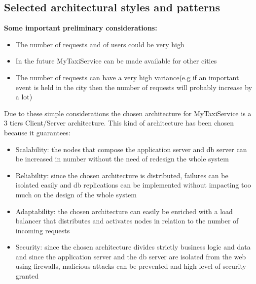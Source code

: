 \documentclass[11pt,titlepage]{article} %
\begin{document}
\subsection{Selected architectural styles and patterns}
        \textbf{Some important preliminary considerations:}
        \begin{itemize}
	        \item The number of requests and of users could be very high
	        \item In the future MyTaxiService can be made available for other cities
	        \item The number of requests can have a very high variance(e.g if an important event is held in the city then the number
	        of requests will probably increase by a lot)
         \end{itemize}

        \noindent Due to these simple considerations the chosen architecture for MyTaxiService is a 3 tiers Client/Server architecture.
        This kind of architecture has been chosen because it guarantees:
        \begin{itemize}
	        \item Scalability: the nodes that compose the application server and db server can be increased in number without the need
	        of redesign the whole system
	        \item Reliability: since the chosen architecture is distributed, failures can be isolated easily and db replications can be
	        implemented without impacting too much on the design of the whole system
	        \item Adaptability: the chosen architecture can easily be enriched with a load balancer that distributes and activates nodes
	        in relation to the number of incoming requests
	        \item Security: since the chosen architecture divides strictly business logic and data and since the application server
	        and the db server are isolated from the web using firewalls, malicious attacks can be prevented and high level of
	        security granted
	\end{itemize}
\end{document}
